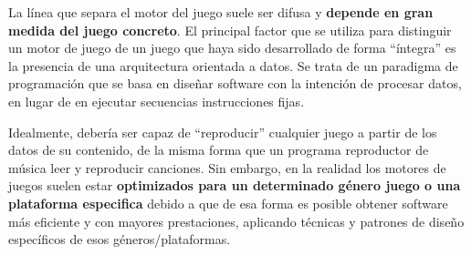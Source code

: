 La línea que separa el motor del juego suele ser difusa y \textbf{depende en gran medida del juego concreto}. El principal factor que se utiliza para distinguir un motor de juego de un juego que haya sido desarrollado de forma ``íntegra'' es la presencia de una arquitectura orientada a datos. Se trata de un paradigma de programación que se basa en diseñar software con la intención de procesar datos, en lugar de en ejecutar secuencias instrucciones fijas.

Idealmente, debería ser capaz de ``reproducir'' cualquier juego a partir de los datos de su contenido, de la misma forma que un programa reproductor de música leer y reproducir canciones. Sin embargo, en la realidad los motores de juegos suelen estar \textbf{optimizados para un determinado género juego o una plataforma especifica} debido a que de esa forma es posible obtener software más eficiente y con mayores prestaciones, aplicando técnicas y patrones de diseño específicos de esos géneros/plataformas.


